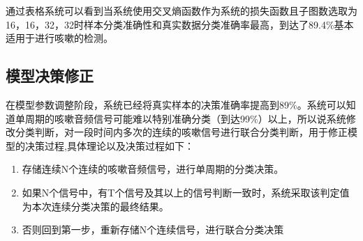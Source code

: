 通过表格系统可以看到当系统使用交叉熵函数作为系统的损失函数且子图数选取为16，16，32，32时样本分类准确性和真实数据分类准确率最高，到达了89.4\%基本适用于进行咳嗽的检测。
\subsection{模型决策修正}
在模型参数调整阶段，系统已经将真实样本的决策准确率提高到89\%。系统可以知道单周期的咳嗽音频信号可能难以特别准确分类（到达99\%）以上，所以说系统修改分类判断，对一段时间内多次的连续的咳嗽信号进行联合分类判断，用于修正模型的决策过程,具体理论以及决策过程如下：
\begin{enumerate}
    \item 存储连续N个连续的咳嗽音频信号，进行单周期的分类决策。
    \item 如果N个信号中，有T个信号及其以上的信号判断一致时，系统采取该判定值为本次连续分类决策的最终结果。
    \item 否则回到第一步，重新存储N个连续信号，进行联合分类决策
\end{enumerate}

